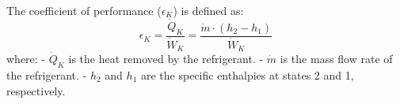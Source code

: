 The coefficient of performance (\(\epsilon_K\)) is defined as:  
\[
\epsilon_K = \frac{\dot{Q}_K}{\dot{W}_K} = \frac{\dot{m} \cdot (h_2 - h_1)}{\dot{W}_K}
\]  
where:  
- \(\dot{Q}_K\) is the heat removed by the refrigerant.  
- \(\dot{m}\) is the mass flow rate of the refrigerant.  
- \(h_2\) and \(h_1\) are the specific enthalpies at states 2 and 1, respectively.